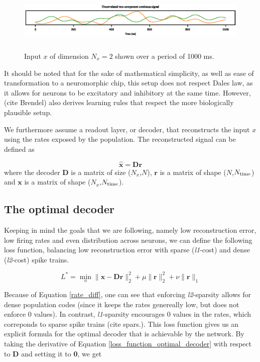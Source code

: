 \documentclass[twoside,11pt]{article}
\begin{document}
\begin{figure}[!htb]
    \includegraphics[width = \columnwidth, height=3cm]{figures/input.eps}
    \caption{Input $x$ of dimension $N_x = 2$ shown over a period of 1000 ms.}
    \label{fig:input}
\end{figure}

It should be noted that for the sake of mathematical simplicity, as well as ease of
transformation to a neuromorphic chip, this setup does not respect Dales law, as it
allows for neurons to be excitatory and inhibitory at the same time. However, (cite Brendel)
also derives learning rules that respect the more biologically plausible setup.

We furthermore assume a readout layer, or decoder, that reconstructs the input $x$ using
the rates exposed by the population. The reconstructed signal can be defined as

\begin{equation} \label{reconstructed_x_explicit}
    \mathbf{\hat{x}} = \mathbf{Dr}
\end{equation} 
where the decoder $\mathbf{D}$ is a matrix of size ($N_x$,$N$), $\mathbf{r}$ is a matrix of shape
($N$,$N_\textnormal{time}$) and $\mathbf{x}$ is a matrix of shape ($N_x$,$N_\textnormal{time}$).

\subsection{The optimal decoder}

Keeping in mind the goals that we are following, namely low reconstruction error, low firing
rates and even distribution across neurons, we can define the following loss function, balancing
low reconstruction error with sparse (\textit{l1}-cost) and dense (\textit{l2}-cost) spike trains.

\begin{equation} \label{loss_function_optimal_decoder}
    L^* = \min_{o} \|\mathbf{x} - \mathbf{Dr}\| ^2_2 + \mu \|\mathbf{r}\|_2^2 + \nu \|\mathbf{r}\|_1
\end{equation}

Because of Equation \ref{rate_diff}, one can see that enforcing \textit{l2}-sparsity allows for
dense population codes (since it keeps the rates genereally low, but does not enforce 0 values). 
In contrast, \textit{l1}-sparsity encourages 0 values in the rates, which correponds to sparse spike trains (cite spars.).
This loss function gives us an explicit formula for the optimal decoder that is achievable by the network.
By taking the derivative of Equation \ref{loss_function_optimal_decoder} with respect to $\mathbf{D}$ and setting it to \textbf{0}, we get
\end{document}

